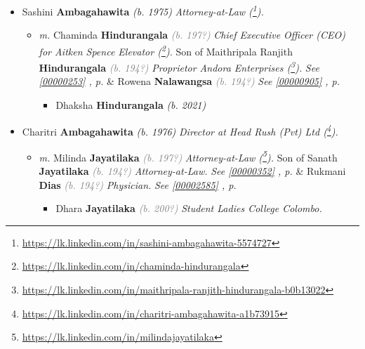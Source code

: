 \documentclass[10pt, openany]{book}
\begin{document}
\begin{itemize}
{\begin{itemize}
{\begin{itemize}
{\begin{itemize}
\item{Sashini \textbf{Ambagahawita} \textcolor{slorange}{\textit{(b. 1975)}} \textcolor{slmaroon}{\textit{Attorney-at-Law (\footnote{\url{https://lk.linkedin.com/in/sashini-ambagahawita-5574727}}).}}
\begin{itemize}
\item{\textit{m.} Chaminda \textbf{Hindurangala} \textcolor{gray}{\textit{(b. 197?)}} \textcolor{slmaroon}{\textit{Chief Executive Officer (CEO) for Aitken Spence Elevator (\footnote{\url{https://lk.linkedin.com/in/chaminda-hindurangala}}).}} Son of  Maithripala Ranjith \textbf{Hindurangala} \textcolor{gray}{\textit{(b. 194?)}} \textcolor{slmaroon}{\textit{Proprietor Andora Enterprises (\footnote{\url{https://lk.linkedin.com/in/maithripala-ranjith-hindurangala-b0b13022}}).}} \textcolor{slteal}{\textit{See  \autoref{00000253} \textit{, p. \pageref{00000253} }}}  \&  Rowena \textbf{Nalawangsa} \textcolor{gray}{\textit{(b. 194?)}} \textcolor{slteal}{\textit{See  \autoref{00000905} \textit{, p. \pageref{00000905} }}}   \label{couple:00000088:00000252} \begin{itemize}
\item{Dhaksha \textbf{Hindurangala} \textcolor{slorange}{\textit{(b. 2021)}}
 }
\end{itemize}}
\end{itemize}
 }
\item{Charitri \textbf{Ambagahawita} \textcolor{slorange}{\textit{(b. 1976)}} \textcolor{slmaroon}{\textit{Director at Head Rush (Pvt) Ltd (\footnote{\url{https://lk.linkedin.com/in/charitri-ambagahawita-a1b73915}}).}}
\begin{itemize}
\item{\textit{m.} Milinda \textbf{Jayatilaka} \textcolor{gray}{\textit{(b. 197?)}} \textcolor{slmaroon}{\textit{Attorney-at-Law (\footnote{\url{https://lk.linkedin.com/in/milindajayatilaka}}).}} Son of  Sanath \textbf{Jayatilaka} \textcolor{gray}{\textit{(b. 194?)}} \textcolor{slmaroon}{\textit{Attorney-at-Law.}} \textcolor{slteal}{\textit{See  \autoref{00000352} \textit{, p. \pageref{00000352} }}}  \&  Rukmani \textbf{Dias} \textcolor{gray}{\textit{(b. 194?)}} \textcolor{slmaroon}{\textit{Physician.}} \textcolor{slteal}{\textit{See  \autoref{00002585} \textit{, p. \pageref{00002585} }}}   \label{couple:00000074:00000351} \begin{itemize}
\item{Dhara \textbf{Jayatilaka} \textcolor{gray}{\textit{(b. 200?)}} \textcolor{slmaroon}{\textit{Student Ladies College Colombo.}}
}
\end{itemize}}
\end{itemize}}
\end{itemize}}
\end{itemize}}
\end{itemize}}
\end{itemize}
\end{document}
